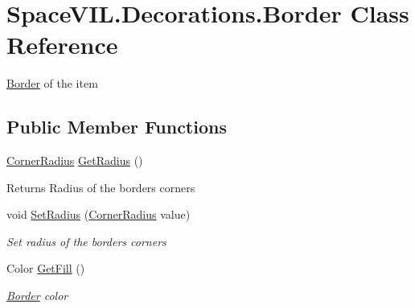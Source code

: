\hypertarget{class_space_v_i_l_1_1_decorations_1_1_border}{}\section{Space\+V\+I\+L.\+Decorations.\+Border Class Reference}
\label{class_space_v_i_l_1_1_decorations_1_1_border}


\mbox{\hyperlink{class_space_v_i_l_1_1_decorations_1_1_border}{Border}} of the item  


\subsection*{Public Member Functions}
\begin{DoxyCompactItemize}
\item 
\mbox{\label{class_space_v_i_l_1_1_decorations_1_1_border_a6659d07036aad601de55e9967ecd611f}} 
\mbox{\hyperlink{class_space_v_i_l_1_1_decorations_1_1_corner_radius}{Corner\+Radius}} \mbox{\hyperlink{class_space_v_i_l_1_1_decorations_1_1_border_a6659d07036aad601de55e9967ecd611f}{Get\+Radius}} ()
\begin{DoxyCompactList}\small\item\em \begin{DoxyReturn}{Returns}
Radius of the border\textquotesingle{}s corners 
\end{DoxyReturn}
\end{DoxyCompactList}\item 
void \mbox{\hyperlink{class_space_v_i_l_1_1_decorations_1_1_border_a800519d1eb6417875e3002c5c8cb67de}{Set\+Radius}} (\mbox{\hyperlink{class_space_v_i_l_1_1_decorations_1_1_corner_radius}{Corner\+Radius}} value)
\begin{DoxyCompactList}\small\item\em Set radius of the border\textquotesingle{}s corners \end{DoxyCompactList}\item 
Color \mbox{\hyperlink{class_space_v_i_l_1_1_decorations_1_1_border_aad64c5e394a76afaf146a06f87c7a287}{Get\+Fill}} ()
\begin{DoxyCompactList}\small\item\em \mbox{\hyperlink{class_space_v_i_l_1_1_decorations_1_1_border}{Border}} color \end{DoxyCompactList}\item 

\end{DoxyCompactItemize}
